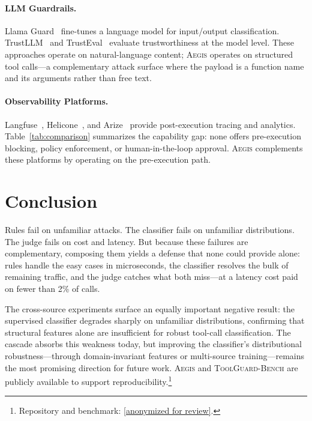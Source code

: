 \documentclass[sigplan,review,anonymous]{acmart}
\newcommand{\system}{\textsc{Aegis}\xspace}
\newcommand{\bench}{\textsc{ToolGuard-Bench}\xspace}
\begin{document}
\paragraph{LLM Guardrails.}
Llama Guard~\cite{inan2023llama} fine-tunes a language model for input/output classification. TrustLLM~\cite{huang2024position} and TrustEval~\cite{wang2024trusteval} evaluate trustworthiness at the model level. These approaches operate on natural-language content; \system operates on structured tool calls---a complementary attack surface where the payload is a function name and its arguments rather than free text.

\paragraph{Observability Platforms.}
Langfuse~\cite{langfuse2024}, Helicone~\cite{helicone2024}, and Arize~\cite{arize2024} provide post-execution tracing and analytics. Table~\ref{tab:comparison} summarizes the capability gap: none offers pre-execution blocking, policy enforcement, or human-in-the-loop approval. \system complements these platforms by operating on the pre-execution path.



\section{Conclusion}

Rules fail on unfamiliar attacks. The classifier fails on unfamiliar distributions. The judge fails on cost and latency.
But because these failures are complementary, composing them yields a defense that none could provide alone: rules handle the easy cases in microseconds, the classifier resolves the bulk of remaining traffic, and the judge catches what both miss---at a latency cost paid on fewer than 2\% of calls.

The cross-source experiments surface an equally important negative result: the supervised classifier degrades sharply on unfamiliar distributions, confirming that structural features alone are insufficient for robust tool-call classification.
The cascade absorbs this weakness today, but improving the classifier's distributional robustness---through domain-invariant features or multi-source training---remains the most promising direction for future work.
\system and \bench are publicly available to support reproducibility.\footnote{Repository and benchmark: \url{[anonymized for review]}.}
\end{document}
